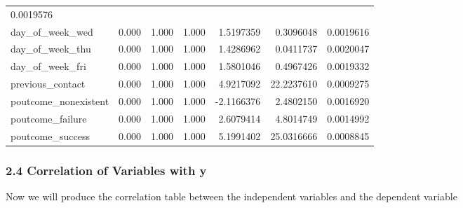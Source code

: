 \documentclass[english,man]{apa6}
\begin{document}
\begin{longtable}[c]{@{}lrrrrrr@{}}
0.0019576\tabularnewline
day\_of\_week\_wed & 0.000 & 1.000 & 1.000 & 1.5197359 & 0.3096048 &
0.0019616\tabularnewline
day\_of\_week\_thu & 0.000 & 1.000 & 1.000 & 1.4286962 & 0.0411737 &
0.0020047\tabularnewline
day\_of\_week\_fri & 0.000 & 1.000 & 1.000 & 1.5801046 & 0.4967426 &
0.0019332\tabularnewline
previous\_contact & 0.000 & 1.000 & 1.000 & 4.9217092 & 22.2237610 &
0.0009275\tabularnewline
poutcome\_nonexistent & 0.000 & 1.000 & 1.000 & -2.1166376 & 2.4802150 &
0.0016920\tabularnewline
poutcome\_failure & 0.000 & 1.000 & 1.000 & 2.6079414 & 4.8014749 &
0.0014992\tabularnewline
poutcome\_success & 0.000 & 1.000 & 1.000 & 5.1991402 & 25.0316666 &
0.0008845\tabularnewline
\bottomrule
\end{longtable}

\subsubsection{2.4 Correlation of Variables with
y}\label{correlation-of-variables-with-y}

Now we will produce the correlation table between the independent
variables and the dependent variable
\end{document}
